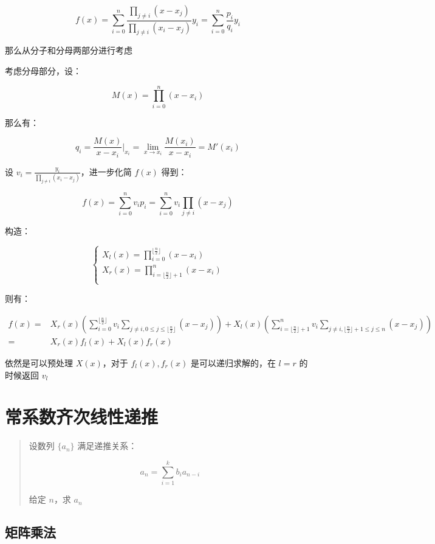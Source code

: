 \documentclass[UTF8]{article}
\begin{document}
$$
f(x)=\sum_{i=0}^{n}\frac{\prod_{j \not= i}(x-x_j)}{\prod_{j \not= i}(x_i-x_j)}y_i=\sum_{i=0}^{n}\frac{p_i}{q_i}y_i
$$

那么从分子和分母两部分进行考虑

考虑分母部分，设：

$$
M(x)=\prod_{i=0}^{n}(x-x_i)
$$

那么有：

$$
q_i=\frac{M(x)}{x-x_i}\Big|_{x_i}=\lim_{x \to x_i} \frac{M(x_i)}{x-x_i}=M'(x_i)
$$

设 $v_i=\frac{y_i}{\prod_{j \not= i}(x_i-x_j)}$，进一步化简 $f(x)$ 得到：

$$
f(x)=\sum_{i=0}^{n}v_ip_i=\sum_{i=0}^{n}v_i\prod_{j \not =i}(x-x_j)
$$

构造：

$$
\begin{cases}
X_l(x)=\prod_{i=0}^{\lfloor \frac{n}{2} \rfloor} (x-x_i) \\
X_r(x)=\prod_{i=\lfloor \frac{n}{2} \rfloor+1}^{n} (x-x_i) \\
\end{cases}
$$

则有：

$$
\begin{aligned}
f(x)
=&X_r(x)\left(\sum_{i=0}^{\lfloor \frac{n}{2} \rfloor} v_i \sum_{j \not=i,0 \le j \le \lfloor \frac{n}{2} \rfloor}(x-x_j) \right)+X_l(x)\left( \sum_{i=\lfloor \frac{n}{2} \rfloor+1}^{n}v_i \sum_{j \not= i, \lfloor \frac{n}{2} \rfloor+1 \le j \le n} (x-x_j) \right) \\
=&X_r(x)f_l(x)+X_l(x)f_r(x)
\end{aligned}
$$

依然是可以预处理 $X(x)$，对于 $f_l(x),f_r(x)$ 是可以递归求解的，在 $l=r$ 的时候返回 $v_l$

\section{常系数齐次线性递推}

\begin{quotation}
    设数列 $\{a_n\}$ 满足递推关系：

    $$
    a_n=\sum_{i=1}^{k}b_ia_{n-i}
    $$
    
    给定 $n$，求 $a_n$
\end{quotation}

\subsection{矩阵乘法}
\end{document}
